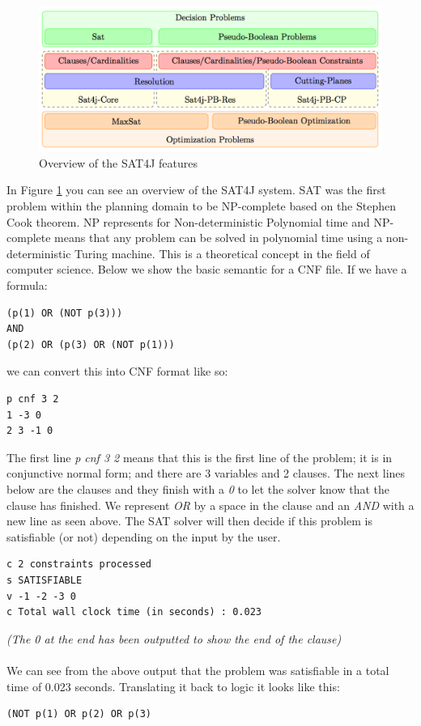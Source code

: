 \begin{figure}[!htb]
    \centering
    \includegraphics[scale=0.27]{SATFeaturesNew.png}
    \caption{Overview of the SAT4J features}
    \label{fig:SAT4J}
\end{figure}
In Figure \ref{fig:SAT4J} you can see an overview of the SAT4J system\cite{SATandSAT4J}. SAT was the first problem within the planning domain to be NP-complete based on the Stephen Cook theorem\cite{SteveCook}. NP represents for Non-deterministic Polynomial time and NP-complete means that any problem can be solved in polynomial time using a non-deterministic Turing machine. This is a theoretical concept in the field of computer science.
Below we show the basic semantic for a CNF file. 
If we have a formula:
\begin{verbatim}
(p(1) OR (NOT p(3)))
AND
(p(2) OR (p(3) OR (NOT p(1)))
\end{verbatim}
we can convert this into CNF format like so:
\begin{verbatim}
p cnf 3 2
1 -3 0
2 3 -1 0
\end{verbatim}
The first line \textit{p cnf 3 2} means that this is the first line of the problem; it is in conjunctive normal form; and there are 3 variables and 2 clauses. The next lines below are the clauses and they finish with a \textit{0} to let the solver know that the clause has finished. We represent \textit{OR} by a space in the clause and an \textit{AND} with a new line as seen above.
The SAT solver will then decide if this problem is satisfiable (or not) depending on the input by the user.
\begin{verbatim}
c 2 constraints processed
s SATISFIABLE
v -1 -2 -3 0
c Total wall clock time (in seconds) : 0.023 
\end{verbatim}
\textit{(The 0 at the end has been outputted to show the end of the clause)}
\\%
\\
We can see from the above output that the problem was satisfiable in a total time of 0.023 seconds. Translating it back to logic it looks like this:
\begin{verbatim}
(NOT p(1) OR p(2) OR p(3)
\end{verbatim} 
 
